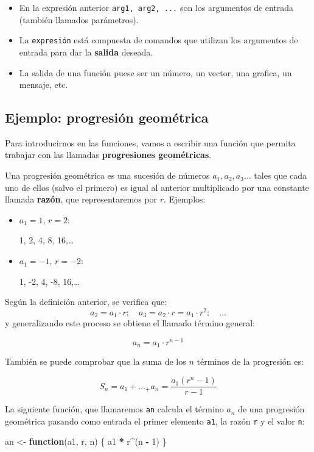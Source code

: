 \documentclass[]{book}
\newenvironment{Shaded}{\begin{snugshade}}{\end{snugshade}}
\newcommand{\ControlFlowTok}[1]{\textcolor[rgb]{0.13,0.29,0.53}{\textbf{#1}}}
\newcommand{\DecValTok}[1]{\textcolor[rgb]{0.00,0.00,0.81}{#1}}
\newcommand{\NormalTok}[1]{#1}
\newcommand{\OperatorTok}[1]{\textcolor[rgb]{0.81,0.36,0.00}{\textbf{#1}}}
\newcommand{\StringTok}[1]{\textcolor[rgb]{0.31,0.60,0.02}{#1}}
\begin{document}
\begin{itemize}
\item
  En la expresión anterior \texttt{arg1,\ arg2,\ ...} son los
  argumentos de entrada (también llamados parámetros).
\item
  La \texttt{expresión} está compuesta de comandos que utilizan los
  argumentos de entrada para dar la \textbf{salida} deseada.
\item
  La salida de una función puese ser un número, un vector, una
  grafica, un mensaje, etc.
\end{itemize}

\hypertarget{ejemplo-progresion-geometrica}{%
\subsection{Ejemplo: progresión geométrica}\label{ejemplo-progresion-geometrica}}

Para introducirnos en las
funciones, vamos a escribir una función que permita trabajar con las
llamadas \textbf{progresiones geométricas}.

Una progresión geométrica es una sucesión de números \(a_1, a_2, a_3\ldots\)
tales que cada uno de ellos (salvo el primero) es igual al anterior
multiplicado por una constante llamada \textbf{razón}, que representaremos
por \(r\). Ejemplos:

\begin{itemize}
\item
  \(a_1=1\), \(r=2\):

  1, 2, 4, 8, 16,\ldots{}
\item
  \(a_1=-1\), \(r=-2\):

  1, -2, 4, -8, 16,\ldots{}
\end{itemize}

Según la definición anterior, se verifica que:
\[a_2=a_1\cdot r; \quad a_3=a_2\cdot r=a_1\cdot r^2; \quad ...\] y
generalizando este proceso se obtiene el llamado término general:

\[a_n=a_1\cdot r^{n-1}\]

También se puede comprobar que la suma de los \(n\) términos de la
progresión es:

\[S_n=a_1+\ldots_+a_n=\frac{a_1(r^n-1)}{r-1}\]

La siguiente función, que llamaremos \texttt{an} calcula el término
\(a_n\) de una progresión geométrica pasando como entrada el primer
elemento \texttt{a1}, la razón \texttt{r} y el valor \texttt{n}:

\begin{Shaded}
\begin{Highlighting}[]
\NormalTok{an <-}\StringTok{ }\ControlFlowTok{function}\NormalTok{(a1, r, n) \{}
\NormalTok{        a1 }\OperatorTok{*}\StringTok{ }\NormalTok{r}\OperatorTok{^}\NormalTok{(n }\OperatorTok{-}\StringTok{ }\DecValTok{1}\NormalTok{)}
\NormalTok{      \}}
\end{Highlighting}
\end{Shaded}
\end{document}
